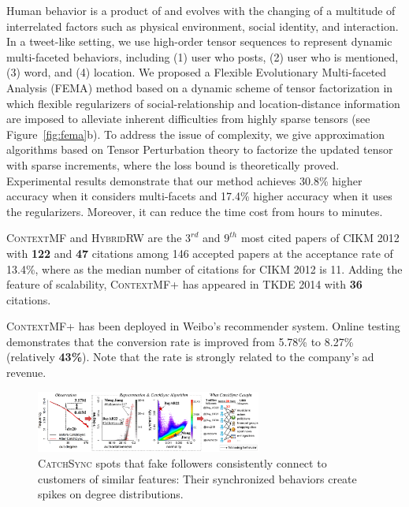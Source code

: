 \documentclass[10.5pt]{article}
\begin{document}
 Human behavior is a product of and evolves with the changing of a multitude of interrelated factors such as physical environment, social identity, and interaction. In a tweet-like setting, we use high-order tensor sequences to represent dynamic multi-faceted behaviors, including (1) user who posts, (2) user who is mentioned, (3) word, and (4) location. We proposed a Flexible Evolutionary Multi-faceted Analysis (\textsc{FEMA}) method \cite{jiang2014fema} based on a dynamic scheme of tensor factorization in which flexible regularizers of social-relationship and location-distance information are imposed to alleviate inherent difficulties from highly sparse tensors (see Figure~\ref{fig:fema}b). To address the issue of complexity, we give approximation algorithms based on Tensor Perturbation theory to factorize the updated tensor with sparse increments, where the loss bound is theoretically proved. Experimental results demonstrate that our method achieves 30.8\% higher accuracy when it considers multi-facets and 17.4\% higher accuracy when it uses the regularizers. Moreover, it can reduce the time cost from hours to minutes.

\begin{compactitem}
\item \textsc{ContextMF} \cite{jiang2012socialcontextual} and \textsc{HybridRW} \cite{jiang2012socialrecommendation} are the $3^{rd}$ and $9^{th}$ most cited papers of CIKM 2012 with \textbf{122} and \textbf{47} citations among 146 accepted papers at the acceptance rate of 13.4\%, where as the median number of citations for CIKM 2012 is 11. Adding the feature of scalability, \textsc{ContextMF+} \cite{jiang2014scalable} has appeared in TKDE 2014 with \textbf{36} citations.
\item \textsc{ContextMF+} has been deployed in Weibo's recommender system. Online testing demonstrates that the conversion rate is improved from 5.78\% to 8.27\% (relatively \textbf{43\%}). Note that the rate is strongly related to the company's ad revenue.
\end{compactitem}

\vskip 0.03in


\begin{figure}
\vskip -0.12in
\includegraphics[width=0.66\textwidth]{figure/catchsync.pdf}
\vskip -0.18in
\caption{\textsc{CatchSync} \cite{jiang2014catchsync} spots that fake followers consistently connect to customers of similar features: Their synchronized behaviors create spikes on degree distributions.}
\label{fig:catchsync}
\vskip -0.12in
\end{figure}
\end{document}
